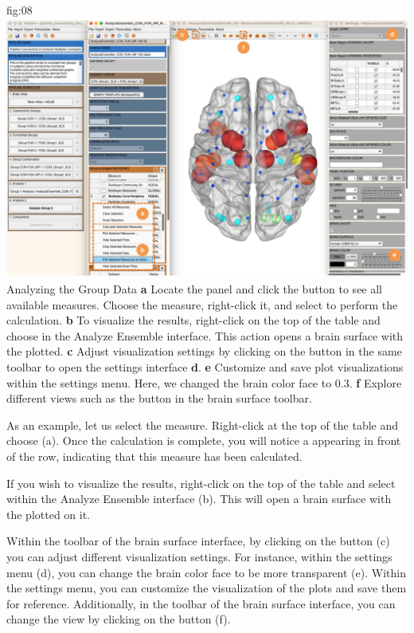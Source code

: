 \documentclass[justified]{tufte-handout}
\begin{document}
	{fig:08}
	{
	\includegraphics{fig08.jpg}
	}
	{Analyzing the Group Data}
	{
	{\bf a} Locate the  panel and click the  button to see all available measures. Choose the  measure, right-click it, and select  to perform the calculation.
	{\bf b} To visualize the results, right-click on the top of the table and choose  in the Analyze Ensemble interface. This action opens a brain surface with the  plotted.
	{\bf c} Adjust visualization settings by clicking on the  button in the same toolbar to open the settings interface {\bf d}.
	{\bf e} Customize and save plot visualizations within the settings menu. Here, we changed the brain color face to 0.3.
 	{\bf f} Explore different views such as the  button in the brain surface toolbar.
	}

As an example, let us select the  measure. Right-click at the top of the table and choose  (a). Once the calculation is complete, you will notice a  appearing in front of the  row, indicating that this measure has been calculated.

If you wish to visualize the results, right-click on the top of the table and select  within the Analyze Ensemble interface (b). This will open a brain surface with the  plotted on it.

Within the toolbar of the brain surface interface, by clicking on the  button (c) you can adjust different visualization settings.
For instance, within the settings menu (d), you can change the brain color face to be more transparent (e). Within the settings menu, you can customize the visualization of the plots and save them for reference.
Additionally, in the toolbar of the brain surface interface, you can change the view by clicking on the  button (f). 
\end{document}
